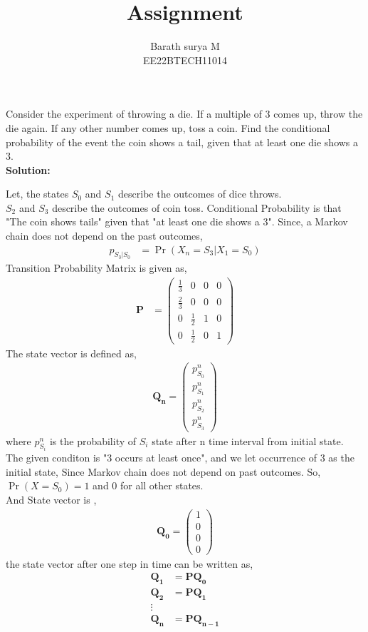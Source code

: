 \documentclass[journal,12pt,two column]{IEEEtran}
\title{Assignment}
\author{Barath surya M \\ EE22BTECH11014}
\providecommand{\pr}[1]{\ensuremath{\Pr\left(#1\right)}}
\newcommand{\solution}{\noindent \textbf{Solution: }}
\newcommand{\myvec}[1]{\ensuremath{\begin{pmatrix}#1\end{pmatrix}}}
\providecommand{\pr}[1]{\ensuremath{\Pr\left(#1\right)}}
\let\vec\mathbf
\begin{document}
\maketitle
Consider the experiment of throwing a die. If a multiple of 3 comes up, throw the die again. If any other number comes up, toss a coin. Find the conditional probability of the event the coin shows a tail, given that  at least one die shows a 3.\\
\solution
\begin{table}[ht!]
	
\end{table}
Let, the states $S_0$ and $S_1$ describe the outcomes of dice throws.\\
$S_2$ and $S_3$ describe the outcomes of coin toss.
Conditional Probability is that "The coin shows tails" given that "at least one die shows a 3".
Since, a Markov chain does not depend on the past outcomes,
\begin{align}
    p_{S_3 | S_0}&=\pr{X_n=S_3|X_1 =S_0}
\end{align}
Transition Probability Matrix is given as,
\begin{align}
    \vec{P}&=\myvec{\frac{1}{3}&0&0&0\\
                    \frac{2}{3}&0&0&0\\
                    0&\frac{1}{2}&1&0\\
                    0&\frac{1}{2}&0&1
                }
\end{align}
The state vector is defined as,
\begin{align}
	\vec{Q_n}=\myvec{p_{S_0}^n\\p_{S_1}^n\\p_{S_2}^n\\p_{S_3}^n}
\end{align}
where $p_{S_i}^n$ is the probability of $S_i$ state after n time interval from initial state.\\
The given conditon is "3 occurs at least once", and we let occurrence of 3 as the initial state, Since Markov chain does not depend on past outcomes. So, $\pr{X=S_0}=1$ and 0 for all other states.\\
And State vector is ,
\begin{align}
    \vec{Q_0}=\myvec{1\\0\\0\\0}
\end{align}
the state vector after one step in time can be written as,
\begin{align}
    \vec{Q_1}&=\vec{P Q_0}\\
    \vec{Q_2}&=\vec{P Q_1}\\
    \vdots\\
    \vec{Q_{n}}&=\vec{P Q_{n-1}}
\end{align}
\end{document}
